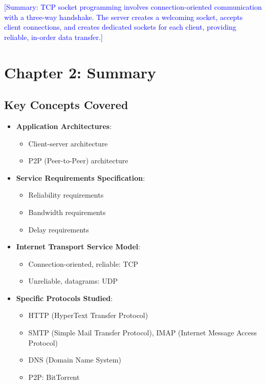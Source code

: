 \documentclass[12pt]{article}
\begin{document}
\textcolor{blue}{[Summary: TCP socket programming involves connection-oriented communication with a three-way handshake. The server creates a welcoming socket, accepts client connections, and creates dedicated sockets for each client, providing reliable, in-order data transfer.]}

\section{Chapter 2: Summary}

\subsection{Key Concepts Covered}

\begin{itemize}
    \item \textbf{Application Architectures}:
          \begin{itemize}
              \item Client-server architecture
              \item P2P (Peer-to-Peer) architecture
          \end{itemize}

    \item \textbf{Service Requirements Specification}:
          \begin{itemize}
              \item Reliability requirements
              \item Bandwidth requirements
              \item Delay requirements
          \end{itemize}

    \item \textbf{Internet Transport Service Model}:
          \begin{itemize}
              \item Connection-oriented, reliable: TCP
              \item Unreliable, datagrams: UDP
          \end{itemize}

    \item \textbf{Specific Protocols Studied}:
          \begin{itemize}
              \item HTTP (HyperText Transfer Protocol)
              \item SMTP (Simple Mail Transfer Protocol), IMAP (Internet Message Access Protocol)
              \item DNS (Domain Name System)
              \item P2P: BitTorrent
          \end{itemize}


\end{itemize}
\end{document}

